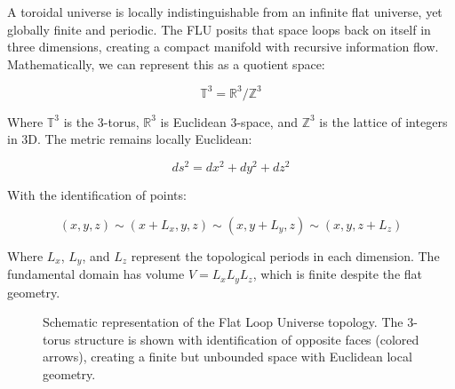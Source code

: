 \documentclass[12pt]{article}
\begin{document}
A toroidal universe is locally indistinguishable from an infinite flat universe, yet globally finite and periodic. The FLU posits that space loops back on itself in three dimensions, creating a compact manifold with recursive information flow. Mathematically, we can represent this as a quotient space:

\begin{equation}
\mathbb{T}^3 = \mathbb{R}^3 / \mathbb{Z}^3
\end{equation}

Where $\mathbb{T}^3$ is the 3-torus, $\mathbb{R}^3$ is Euclidean 3-space, and $\mathbb{Z}^3$ is the lattice of integers in 3D. The metric remains locally Euclidean:

\begin{equation}
ds^2 = dx^2 + dy^2 + dz^2
\end{equation}

With the identification of points:

\begin{equation}
(x,y,z) \sim (x+L_x, y, z) \sim (x, y+L_y, z) \sim (x, y, z+L_z)
\end{equation}

Where $L_x$, $L_y$, and $L_z$ represent the topological periods in each dimension. The fundamental domain has volume $V = L_x L_y L_z$, which is finite despite the flat geometry.

\begin{figure}[ht]
\centering
{}
\caption{Schematic representation of the Flat Loop Universe topology. The 3-torus structure is shown with identification of opposite faces (colored arrows), creating a finite but unbounded space with Euclidean local geometry.}
\label{fig:torus}
\end{figure}
\end{document}
